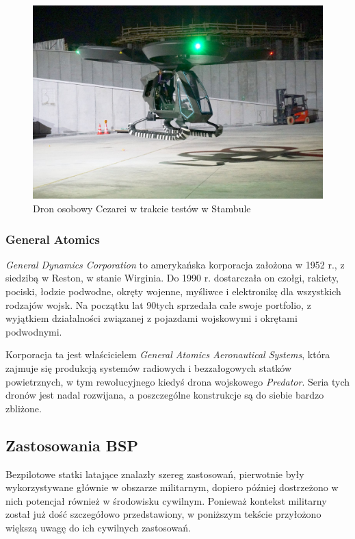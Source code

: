 \begin{figure}[!h]
\begin{center}
  \includegraphics[width=12cm]{./Obrazy/cezarei.jpg}
  \caption{Dron osobowy Cezarei w trakcie testów w Stambule}
\end{center}
\end{figure}

\subsubsection{General Atomics}
\textit{General Dynamics Corporation} to amerykańska korporacja założona w 1952 r., z siedzibą w Reston, w stanie Wirginia. Do 1990 r. dostarczała on czołgi, rakiety, pociski, łodzie podwodne, okręty wojenne, myśliwce i elektronikę dla wszystkich rodzajów wojsk. Na początku lat 90tych sprzedała całe swoje portfolio, z wyjątkiem działalności związanej z pojazdami wojskowymi i okrętami podwodnymi.

Korporacja ta jest właścicielem \textit{General Atomics Aeronautical Systems}, która zajmuje się produkcją systemów radiowych i bezzałogowych statków powietrznych, w tym rewolucyjnego kiedyś drona wojskowego \textit{Predator}. Seria tych dronów jest nadal rozwijana, a poszczególne konstrukcje są do siebie bardzo zbliżone.\cite{gd-about}\cite{wiki-gaas}

\subsection{Zastosowania BSP}
Bezpilotowe statki latające znalazły szereg zastosowań, pierwotnie były wykorzystywane głównie w obszarze militarnym, dopiero później dostrzeżono w nich potencjał również w środowisku cywilnym. Ponieważ kontekst militarny został już dość szczegółowo przedstawiony, w poniższym tekście przyłożono większą uwagę do ich cywilnych zastosowań.

